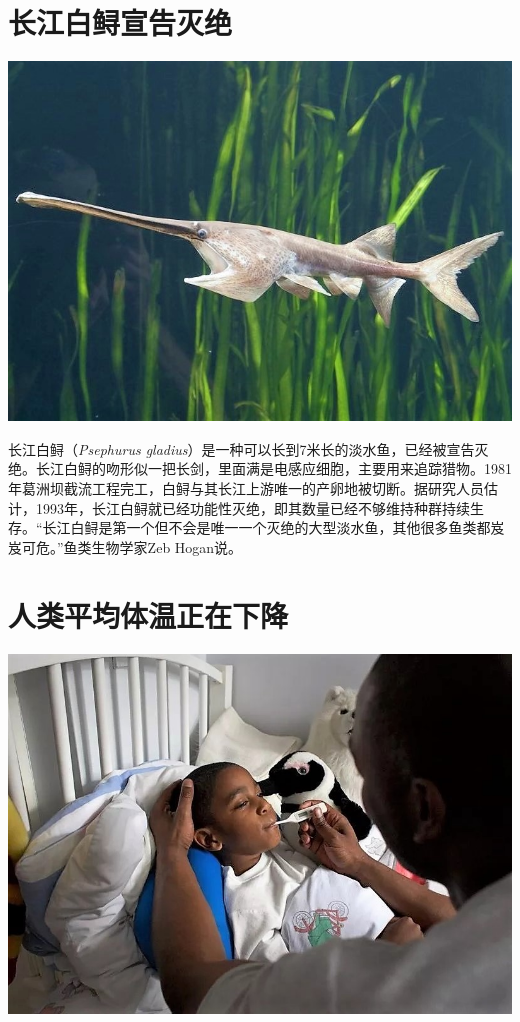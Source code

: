 \newpage
{}
\begin{multicols}{3}

\section*{长江白鲟宣告灭绝}

\noindent\includegraphics[width=\linewidth]{IMG/202001/cjbx.jpg}

长江白鲟（\textit{Psephurus gladius}）是一种可以长到7米长的淡水鱼，已经被宣告灭绝。长江白鲟的吻形似一把长剑，里面满是电感应细胞，主要用来追踪猎物。1981年葛洲坝截流工程完工，白鲟与其长江上游唯一的产卵地被切断。据研究人员估计，1993年，长江白鲟就已经功能性灭绝，即其数量已经不够维持种群持续生存。“长江白鲟是第一个但不会是唯一一个灭绝的大型淡水鱼，其他很多鱼类都岌岌可危。”鱼类生物学家Zeb Hogan说。

\section*{人类平均体温正在下降}

\noindent\includegraphics[width=\linewidth]{IMG/202001/pjtw.jpg}
 

\end{multicols}
